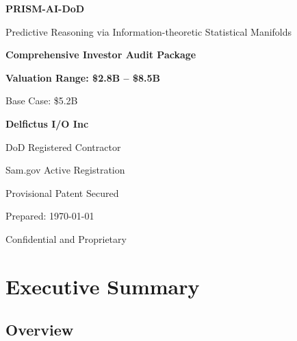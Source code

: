 \documentclass[11pt,letterpaper]{article}
\begin{document}
\begin{titlepage}
    \centering
    \vspace*{2cm}

    {\Huge\bfseries\color{primaryblue} PRISM-AI-DoD\par}
    \vspace{0.5cm}
    {\Large Predictive Reasoning via Information-theoretic Statistical Manifolds\par}
    \vspace{2cm}

    {\LARGE\bfseries Comprehensive Investor Audit Package\par}
    \vspace{1cm}

    \begin{tcolorbox}[colback=lightgray,colframe=primaryblue,width=0.8\textwidth,arc=3mm]
        \centering
        {\Large\bfseries Valuation Range: \$2.8B -- \$8.5B\par}
        \vspace{0.3cm}
        {\large Base Case: \$5.2B\par}
    \end{tcolorbox}

    \vspace{2cm}

    {\Large\bfseries Delfictus I/O Inc\par}
    \vspace{0.5cm}
    {\large DoD Registered Contractor\par}
    {\large Sam.gov Active Registration\par}
    {\large Provisional Patent Secured\par}

    \vfill

    {\large Prepared: \today\par}
    {\large Confidential and Proprietary\par}
\end{titlepage}

\tableofcontents
\newpage

\section{Executive Summary}

\subsection{Overview}
\end{document}
